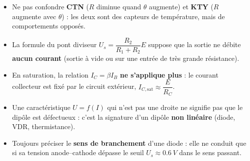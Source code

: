 \documentclass[11pt]{article}
\begin{document}
\begin{attention}
\begin{itemize}
  \item Ne pas confondre \textbf{CTN} ($R$ diminue quand $\theta$ augmente) et \textbf{KTY} ($R$ augmente avec $\theta$) : les deux sont des capteurs de température, mais de comportements opposés.
  \item La formule du pont diviseur $U_s = \dfrac{R_2}{R_1+R_2}E$ suppose que la sortie ne débite \textbf{aucun courant} (sortie à vide ou sur une entrée de très grande résistance).
  \item En saturation, la relation $I_C = \beta I_B$ \textbf{ne s'applique plus} : le courant collecteur est fixé par le circuit extérieur, $I_{C,\mathrm{sat}} \approx \dfrac{E}{R_C}$.
  \item Une caractéristique $U=f(I)$ qui n'est pas une droite ne signifie pas que le dipôle est défectueux : c'est la signature d'un dipôle \textbf{non linéaire} (diode, VDR, thermistance).
  \item Toujours préciser le \textbf{sens de branchement} d'une diode : elle ne conduit que si sa tension anode--cathode dépasse le seuil $U_s \approx \SI{0,6}{V}$ dans le sens passant.
\end{itemize}
\end{attention}
\end{document}
